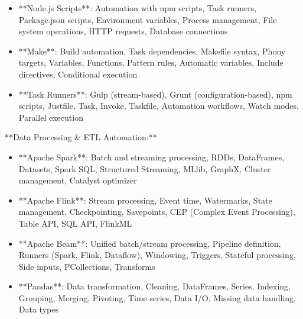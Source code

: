 \documentclass[11pt,a4paper]{article}
\begin{document}
\begin{itemize}
\item **Node.js Scripts**: Automation with npm scripts, Task runners, Package.json scripts, Environment variables, Process management, File system operations, HTTP requests, Database connections
\end{itemize}

\begin{itemize}
\item **Make**: Build automation, Task dependencies, Makefile syntax, Phony targets, Variables, Functions, Pattern rules, Automatic variables, Include directives, Conditional execution
\end{itemize}

\begin{itemize}
\item **Task Runners**: Gulp (stream-based), Grunt (configuration-based), npm scripts, Justfile, Task, Invoke, Taskfile, Automation workflows, Watch modes, Parallel execution
\end{itemize}

**Data Processing \& ETL Automation:**

\begin{itemize}
\item **Apache Spark**: Batch and streaming processing, RDDs, DataFrames, Datasets, Spark SQL, Structured Streaming, MLlib, GraphX, Cluster management, Catalyst optimizer
\end{itemize}

\begin{itemize}
\item **Apache Flink**: Stream processing, Event time, Watermarks, State management, Checkpointing, Savepoints, CEP (Complex Event Processing), Table API, SQL API, FlinkML
\end{itemize}

\begin{itemize}
\item **Apache Beam**: Unified batch/stream processing, Pipeline definition, Runners (Spark, Flink, Dataflow), Windowing, Triggers, Stateful processing, Side inputs, PCollections, Transforms
\end{itemize}

\begin{itemize}
\item **Pandas**: Data transformation, Cleaning, DataFrames, Series, Indexing, Grouping, Merging, Pivoting, Time series, Data I/O, Missing data handling, Data types
\end{itemize}
\end{document}

